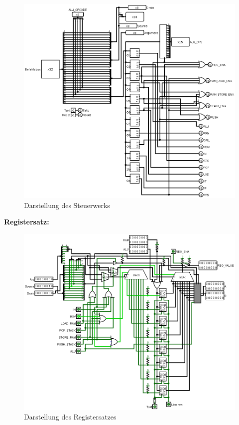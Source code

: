 \documentclass[12pt]{article}
\begin{document}
\begin{figure}[!htb]
\includegraphics[scale=0.40]{cu}
\caption{Darstellung des Steuerwerks}
\centering
\label{fig:register}
\end{figure}

\newpage
\textbf{Registersatz: }
\begin{figure}[!htb]
\includegraphics[scale=0.40]{register}
\caption{Darstellung des Registersatzes}
\centering
\label{fig:register}
\end{figure}
\end{document}
